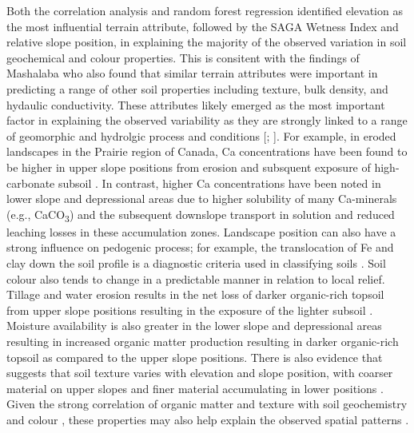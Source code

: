 \documentclass[
  number]{elsarticle}
\begin{document}
Both the correlation analysis and random forest regression identified
elevation as the most influential terrain attribute, followed by the
SAGA Wetness Index and relative slope position, in explaining the
majority of the observed variation in soil geochemical and colour
properties. This is consitent with the findings of Mashalaba
\citep{mashalaba2020} who also found that similar terrain attributes
were important in predicting a range of other soil properties including
texture, bulk density, and hydaulic conductivity. These attributes
likely emerged as the most important factor in explaining the observed
variability as they are strongly linked to a range of geomorphic and
hydrolgic process and conditions {[}\citep{mello2022};
\citep{libohova2024}{]}. For example, in eroded landscapes in the
Prairie region of Canada, Ca concentrations have been found to be higher
in upper slope positions from erosion and subsquent exposure of
high-carbonate subsoil \citep{papiernik2005}. In contrast, higher Ca
concentrations have been noted in lower slope and depressional areas due
to higher solubility of many Ca-minerals (e.g., CaCO\textsubscript{3})
and the subsequent downslope transport in solution and reduced leaching
losses in these accumulation zones. Landscape position can also have a
strong influence on pedogenic process; for example, the translocation of
Fe and clay down the soil profile is a diagnostic criteria used in
classifying soils \citep{stonehouse1971}. Soil colour also tends to
change in a predictable manner in relation to local relief. Tillage and
water erosion results in the net loss of darker organic-rich topsoil
from upper slope positions resulting in the exposure of the lighter
subsoil \citep{papiernik2005}. Moisture availability is also greater in
the lower slope and depressional areas resulting in increased organic
matter production resulting in darker organic-rich topsoil as compared
to the upper slope positions. There is also evidence that suggests that
soil texture varies with elevation and slope position, with coarser
material on upper slopes and finer material accumulating in lower
positions \citep{kokulan2018, cox2003}. Given the strong correlation of
organic matter and texture with soil geochemistry \citep{horowitz1991}
and colour \citep{viscarrarossel2009}, these properties may also help
explain the observed spatial patterns .
\end{document}
